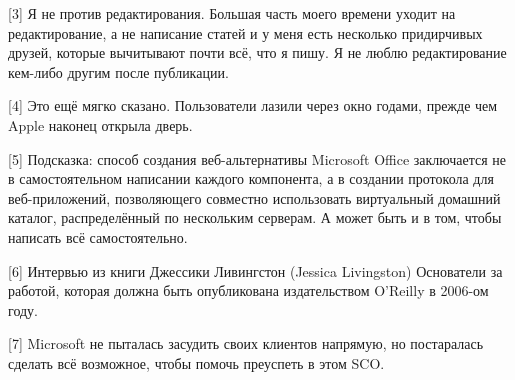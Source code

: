 \documentclass[ebook,12pt,oneside,openany]{memoir}
\begin{document}
[3] Я не против редактирования. Большая часть моего времени уходит на
редактирование, а не написание статей и у меня есть несколько
придирчивых друзей, которые вычитывают почти всё, что я пишу. Я не
люблю редактирование кем-либо другим после публикации.

[4] Это ещё мягко сказано. Пользователи лазили через окно годами,
прежде чем Apple наконец открыла дверь.

[5] Подсказка: способ создания веб-альтернативы Microsoft Office
заключается не в самостоятельном написании каждого компонента, а в
создании протокола для веб-приложений, позволяющего совместно
использовать виртуальный домашний каталог, распределённый по
нескольким серверам. А может быть и в том, чтобы написать всё
самостоятельно.

[6] Интервью из книги Джессики Ливингстон (Jessica Livingston)
Основатели за работой, которая должна быть опубликована издательством
O'Reilly в 2006-ом году.

[7] Microsoft не пыталась засудить своих клиентов напрямую, но
постаралась сделать всё возможное, чтобы помочь преуспеть в этом SCO.
\end{document}
